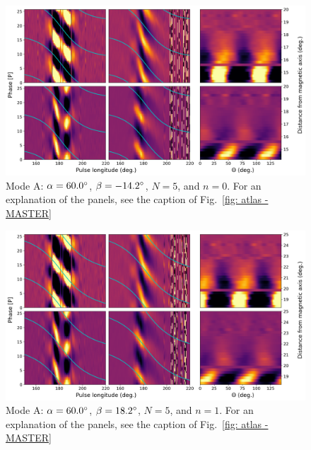 \begin{figure}
	\begin{center}
		\includegraphics[width=\atlasHeightFrac\textwidth]{Figures/B0031/atlas/A_517060005000_plots}
		\caption[Atlas results: Mode A -- $\alpha=60.0\degr$, $\beta=-14.2\degr$, $N=5$, $n=0$]{Mode A: $\alpha=60.0\degr$, $\beta=-14.2\degr$, $N=5$, and $n=0$. For an explanation of the panels, see the caption of Fig.~\ref{fig: atlas - MASTER} }
		\label{fig: atlas - A_517060005000}
	\end{center}
\end{figure}

\begin{figure}
	\begin{center}
		\includegraphics[width=\atlasHeightFrac\textwidth]{Figures/B0031/atlas/A_517060005001_plots}
		\caption[Atlas results: Mode A -- $\alpha=60.0\degr$, $\beta=18.2\degr$, $N=5$, $n=1$]{Mode A: $\alpha=60.0\degr$, $\beta=18.2\degr$, $N=5$, and $n=1$. For an explanation of the panels, see the caption of Fig.~\ref{fig: atlas - MASTER} }
		\label{fig: atlas - A_517060005001}
	\end{center}
\end{figure}

